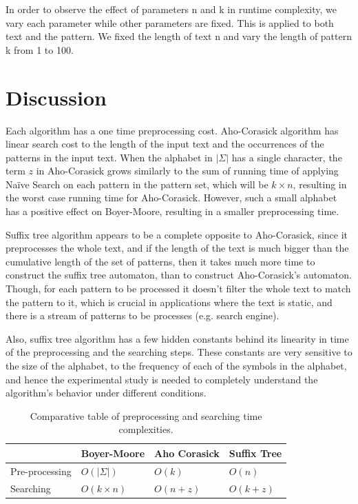 \documentclass[paper=a4, fontsize=11pt]{scrartcl} %
\numberwithin{equation}{section} %
\numberwithin{figure}{section} %
\numberwithin{table}{section} %
\begin{document}
In order to observe the effect of parameters n and k in runtime complexity, we vary each parameter while other parameters are fixed. This is applied to both text and the pattern. We fixed the length of text n and vary the length of pattern k from 1 to 100.   

\section{Discussion}
\par Each algorithm has a one time preprocessing cost. Aho-Corasick algorithm has linear search cost to the length of the input text and the occurrences of the patterns in the input text. When the alphabet in $|\Sigma|$ has a single character, the term $z$ in Aho-Corasick grows similarly to the sum of running time of applying Na\"ive Search on each pattern in the pattern set, which will be $k\times n$, resulting in the worst case running time for Aho-Corasick. However, such a small alphabet has a positive effect on Boyer-Moore, resulting in a smaller preprocessing time.

\par Suffix tree algorithm appears to be a complete opposite to Aho-Corasick, since it preprocesses the whole text, and if the length of the text is much bigger than the cumulative length of the set of patterns, then it takes much more time to construct the suffix tree automaton, than to construct Aho-Corasick's automaton. Though, for each pattern to be processed it doesn't filter the whole text to match the pattern to it, which is crucial in applications where the text is static, and there is a stream of patterns to be processes (e.g. search engine).

\par Also, suffix tree algorithm has a few hidden constants behind its linearity in time of the preprocessing and the searching steps. These constants are very sensitive to the size of the alphabet, to the frequency of each of the symbols in the alphabet, and hence the experimental study is needed to completely understand the algorithm's behavior under different conditions.

\begin{table}[h!]
\centering
\begin{tabular}{| l | l | l | l |}
	\hline
	& Boyer-Moore & Aho Corasick & Suffix Tree \\
	\hline
	Pre-processing & $O(|\Sigma|)$ & $O(k)$ & $O(n)$ \\
	\hline
	Searching & $O(k\times n)$ & $O(n + z)$ & $O(k + z)$ \\
	\hline
\end{tabular}
\caption{Comparative table of preprocessing and searching time complexities.}
\end{table}


\newpage

\end{document}

